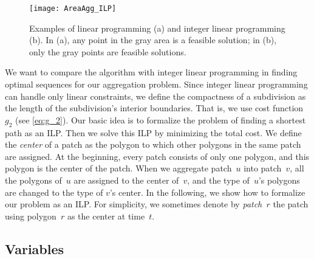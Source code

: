 \documentclass[acmsmall,natbib=false]{acmart}
\begin{document}
\begin{figure*}[tb]
\centering
\texttt{[image: AreaAgg\_ILP]}
\caption{Examples of linear programming (a)
	and integer linear programming (b).
    In (a), any point in the gray area is a feasible solution;
    in (b), only the gray points are feasible solutions.
}
\label{fig:AreaAgg_ILPIllustration}
\end{figure*}

We want to compare the \Astar algorithm with 
integer linear programming in finding 
optimal sequences for our aggregation problem. 
Since integer linear programming
can handle only linear constraints, 
we define the compactness of a subdivision as 
the length of the subdivision's interior boundaries.
That is, we use cost function~$g_2$ (see \eq\ref{eq:g_2}).
Our basic idea is to formalize the problem of 
finding a shortest path as an ILP.
Then we solve this ILP by minimizing the total cost.
We define the \emph{center} of a patch as the polygon 
to which other polygons in the same patch are assigned. 
At the beginning, every patch consists of only one polygon, 
and this polygon is the center of the patch.
When we aggregate patch~$u$ into patch~$v$, 
all the polygons of~$u$ are assigned to the center of~$v$,
and the type of~$u$'s polygons 
are changed to the type of $v$'s center.
In the following, we show how to formalize our problem 
as an ILP.
For simplicity, we sometimes denote by \emph{patch~$r$} the 
patch using polygon~$r$ as the center at time~$t$.


\subsection{Variables}
\label{sub:AreaAgg_variables}
\end{document}

